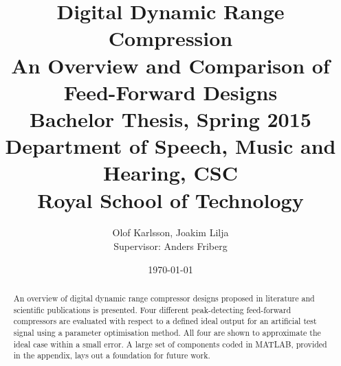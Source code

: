 \documentclass[]{article}
\begin{document}
\newcommand{\rootdir}{.}

\title{Digital Dynamic Range Compression \\ \Large An Overview and Comparison of Feed-Forward Designs\\ \vspace{0.2cm} \large Bachelor Thesis, Spring 2015\\ Department of Speech, Music and Hearing, CSC \\ Royal School of Technology \\ }
\author{Olof Karlsson, Joakim Lilja \\ Supervisor: Anders Friberg }
\date{\today}
\maketitle

\begin{abstract}
An overview of digital dynamic range compressor designs proposed in literature and scientific publications is presented. Four different peak-detecting feed-forward compressors are evaluated with respect to a defined ideal output for an artificial test signal using a parameter optimisation method. All four are shown to approximate the ideal case within a small error. A large set of components coded in MATLAB\textsuperscript{\textregistered}, provided in the appendix, lays out a foundation for future work.
\end{abstract}
\clearpage

\tableofcontents
\clearpage


\clearpage









\clearpage


\FloatBarrier
\clearpage


\end{document}
